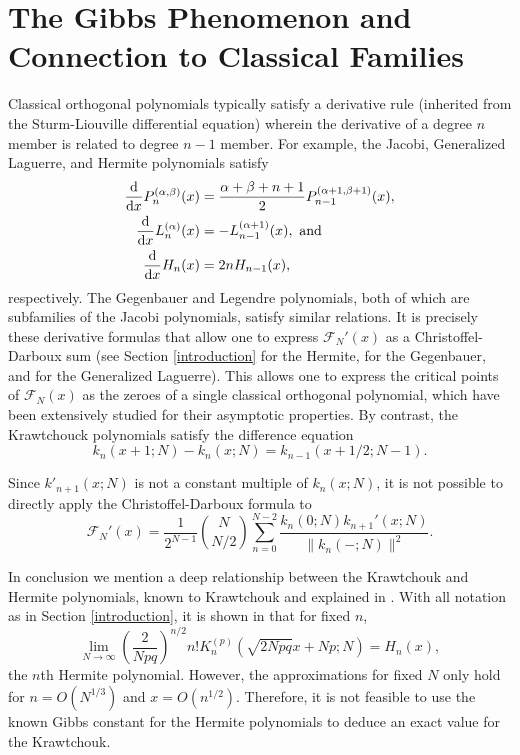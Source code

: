 \documentclass{amsart}
\theoremstyle{plain}
\theoremstyle{remark}
\begin{document}
\section{The Gibbs Phenomenon and Connection to Classical Families} \label{gibbs}

Classical orthogonal polynomials typically satisfy a derivative rule (inherited from the Sturm-Liouville differential equation) wherein the derivative of a degree $n$ member is related to degree $n-1$ member. For example, the Jacobi, Generalized Laguerre, and Hermite polynomials satisfy
\begin{align*}
\frac{{\rm d}}{{\rm d}x} P_{n}^{(\alpha,\beta)}(x) &= \frac{\alpha+\beta+n+1}{2}P_{n-1}^{(\alpha + 1,\beta+1)}(x), \\
\frac{{\rm d}}{{\rm d}x} L_n^{(\alpha)}(x) &= -L_{n-1}^{(\alpha+1)}(x), \text{ and} \\
\frac{{\rm d}}{{\rm d}x} H_n(x) &= 2nH_{n-1}(x), 
\end{align*}
respectively.  The Gegenbauer and Legendre polynomials, both of which are subfamilies of the Jacobi polynomials, satisfy similar relations.  It is precisely these derivative formulas that allow one to express $\mathcal{F}_N'(x)$ as a Christoffel-Darboux sum (see Section \ref{introduction} for the Hermite, \cite[Prop.~1]{kaber} for the Gegenbauer, and \cite[\S 4]{cs} for the Generalized Laguerre).  This allows one to express the critical points of $\mathcal{F}_N(x)$ as the zeroes of a single classical orthogonal polynomial, which have been extensively studied for their asymptotic properties. By contrast, the Krawtchouck polynomials satisfy the difference equation
\[
k_n(x+1;N) - k_n(x;N) = k_{n-1}(x+1/2;N-1).
\]

Since $k'_{n+1}(x;N)$ is not a constant multiple of $k_{n}(x;N)$, it is not possible to directly apply the Christoffel-Darboux formula to 
\[
\mathcal{F}_N'(x) = \frac{1}{2^{N-1}} \binom{N}{N/2} \sum_{n=0}^{N-2} \frac{k_n(0;N)k_{n+1}'(x;N)}{\|k_n(-;N)\|^2}.
\]

In conclusion we mention a deep relationship between the Krawtchouk and Hermite polynomials, known to Krawtchouk \cite{krav} and explained in \cite{mina}.  With all notation as in Section \ref{introduction}, it is shown in \cite[Equation (4)]{mina} that for fixed $n$, 
\[
\lim_{N \to \infty} \left(\frac{2}{Npq}\right)^{n/2} n!K_n^{(p)}(\sqrt{2Npq}x + Np;N) = H_n(x),
\]
the $n$th Hermite polynomial.  However, the approximations for fixed $N$ only hold for $n = O(N^{1/3})$ and $x = O(n^{1/2})$.  Therefore, it is not feasible to use the known Gibbs constant for the Hermite polynomials to deduce an exact value for the Krawtchouk.
\end{document}
